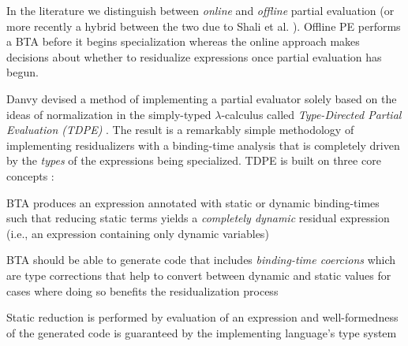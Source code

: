 \documentclass[a4paper,12pt,twoside,openright]{report}
\newenvironment{tight_enumerate}{
\begin{enumerate}
  \setlength{\itemsep}{0pt}
  \setlength{\parskip}{0pt}
}{\end{enumerate}}
\theoremstyle{definition}
\begin{document}

In the literature we distinguish between \textit{online} and \textit{offline} partial evaluation \cite{jones1993partial} (or more recently a hybrid between the two due to Shali et al. \cite{shali2011hybrid}). Offline PE performs a BTA before it begins specialization whereas the online approach makes decisions about whether to residualize expressions once partial evaluation has begun.

Danvy devised a method of implementing a partial evaluator solely based on the ideas of normalization in the simply-typed $\lambda$-calculus called \textit{Type-Directed Partial Evaluation (TDPE)} \cite{danvy1999type}. The result is a remarkably simple methodology of implementing residualizers with a binding-time analysis that is completely driven by the \textit{types} of the expressions being specialized. TDPE is built on three core concepts \cite{danvy1997online,grobauer2001second}:
\begin{tight_enumerate}
    \item BTA produces an expression annotated with static or dynamic binding-times such that reducing static terms yields a \textit{completely dynamic} residual expression (i.e., an expression containing only dynamic variables)
    \item BTA should be able to generate code that includes \textit{binding-time coercions} which are type corrections that help to convert between dynamic and static values for cases where doing so benefits the residualization process
    \item Static reduction is performed by evaluation of an expression and well-formedness of the generated code is guaranteed by the implementing language's type system
\end{tight_enumerate}
\end{document}
